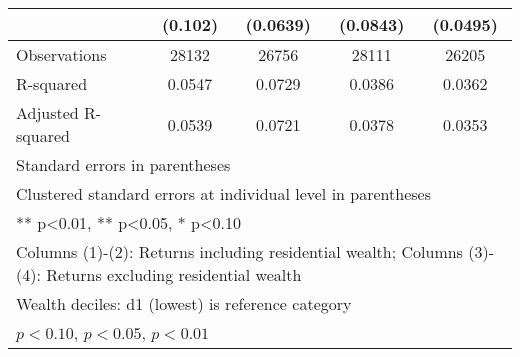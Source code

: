\begin{table}[htbp]
\begin{tabular}{l*{4}{c}}
                &  (0.102)         & (0.0639)         & (0.0843)         & (0.0495)         \\
\midrule
Observations    &    28132         &    26756         &    28111         &    26205         \\
R-squared       &   0.0547         &   0.0729         &   0.0386         &   0.0362         \\
Adjusted R-squared&   0.0539         &   0.0721         &   0.0378         &   0.0353         \\
\bottomrule
\multicolumn{5}{l}{\footnotesize Standard errors in parentheses}\\
\multicolumn{5}{l}{\footnotesize Clustered standard errors at individual level in parentheses}\\
\multicolumn{5}{l}{\footnotesize *** p<0.01, ** p<0.05, * p<0.10}\\
\multicolumn{5}{l}{\footnotesize Columns (1)-(2): Returns including residential wealth; Columns (3)-(4): Returns excluding residential wealth}\\
\multicolumn{5}{l}{\footnotesize Wealth deciles: d1 (lowest) is reference category}\\
\multicolumn{5}{l}{\footnotesize \sym{*} \(p<0.10\), \sym{**} \(p<0.05\), \sym{***} \(p<0.01\)}\\
\end{tabular}
\end{table}
